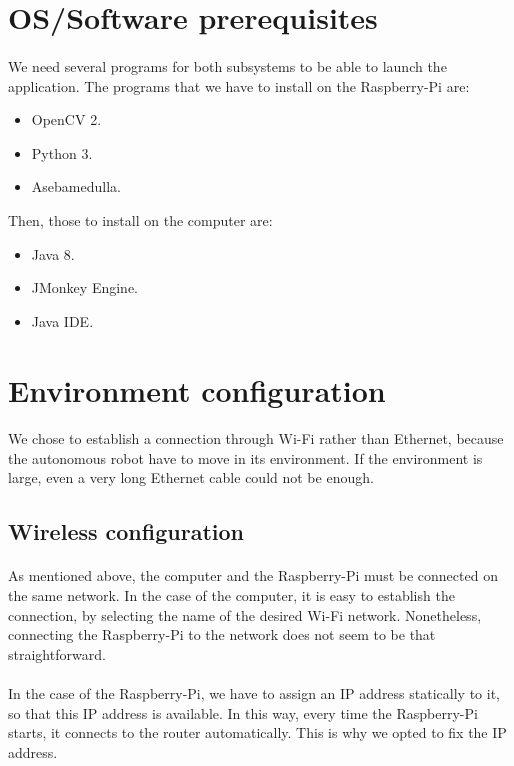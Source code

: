 \documentclass[12pt]{report}
\begin{document}
\section{OS/Software prerequisites}
\paragraph{}
We need several programs for both subsystems to be able to launch the application. The programs that we have to install on the Raspberry-Pi are:
\begin{itemize}
    \item OpenCV 2.
    \item Python 3.
    \item Asebamedulla.
\end{itemize}
Then, those to install on the computer are:
\begin{itemize}
    \item Java 8.
    \item JMonkey Engine.
    \item Java IDE.
\end{itemize}
\section{Environment configuration}
\paragraph{}
We chose to establish a connection through Wi-Fi rather than Ethernet, because the autonomous robot have to move in its environment. If the environment is large, even a very long Ethernet cable could not be enough.

\subsection{Wireless configuration}
\paragraph{}
As mentioned above, the computer and the Raspberry-Pi must be connected on the same network. In the case of the computer, it is easy to establish the connection, by selecting the name of the desired Wi-Fi network. Nonetheless, connecting the Raspberry-Pi to the network does not seem to be that straightforward.
\paragraph{}
In the case of the Raspberry-Pi, we have to assign an IP address statically to it, so that this IP address is available. In this way, every time the Raspberry-Pi starts, it connects to the router automatically. This is why we opted to fix the IP address. 
\end{document}
